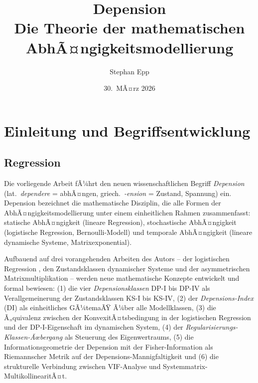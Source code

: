 ﻿\documentclass[12pt, a4paper]{article}
\title{%
  \textbf{Depension}\\
  {\Large Die Theorie der mathematischen AbhÃ¤ngigkeitsmodellierung}}
\author{Stephan Epp}
\date{30.\ MÃ¤rz 2026}
\theoremstyle{definition}
\theoremstyle{remark}
\begin{document}

\maketitle
\setcounter{tocdepth}{2}
\tableofcontents
\newpage

\section{Einleitung und Begriffsentwicklung}
\label{sec:einleitung}

\subsection{Regression}
Die vorliegende Arbeit fÃ¼hrt den neuen wissenschaftlichen Begriff \emph{Depension}
(lat.\ \emph{dependere} = abhÃ¤ngen, griech.\ \emph{-ension} = Zustand, Spannung) ein.
Depension bezeichnet die mathematische Disziplin, die alle Formen der
AbhÃ¤ngigkeitsmodellierung unter einem einheitlichen Rahmen zusammenfasst: statische
AbhÃ¤ngigkeit (lineare Regression), stochastische AbhÃ¤ngigkeit (logistische Regression,
Bernoulli-Modell) und temporale AbhÃ¤ngigkeit (lineare dynamische Systeme, Matrixexponential).

Aufbauend auf drei vorangehenden Arbeiten des Autors -- der logistischen Regression
\citep{epp2026logreg}, den Zustandsklassen dynamischer Systeme
\citep{epp2026sysstate} und der asymmetrischen Matrixmultiplikation
\citep{epp2026systemth} -- werden neue mathematische Konzepte entwickelt und formal
bewiesen: (1) die vier \emph{Depensionsklassen} DP-I bis DP-IV als Verallgemeinerung
der Zustandsklassen KS-I bis KS-IV, (2) der \emph{Depensions-Index} (DI) als
einheitliches GÃ¼temaÃŸ Ã¼ber alle Modellklassen, (3) die Ã„quivalenz zwischen der
KonvexitÃ¤tsbedingung in der logistischen Regression und der DP-I-Eigenschaft im
dynamischen System, (4) der \emph{Regularisierungs-Klassen-Ãœbergang} als Steuerung
des Eigenwertraums, (5) die Informationsgeometrie der Depension mit der
Fisher-Information als Riemannscher Metrik auf der Depensions-Man\-nig\-fal\-tig\-keit
und (6) die strukturelle Verbindung zwischen VIF-Analyse und
Systemmatrix-MultikollinearitÃ¤t.
\end{document}
